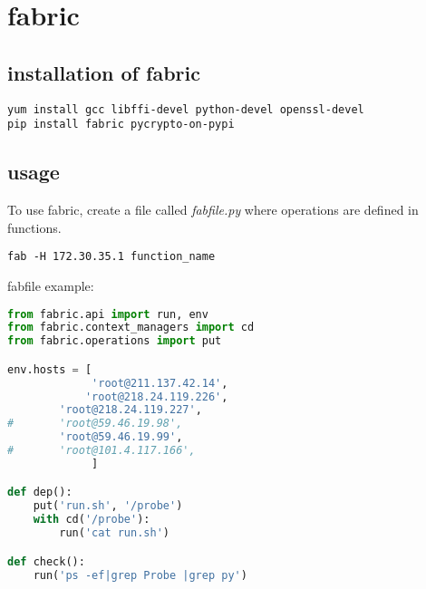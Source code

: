 \section{fabric}

\subsection{installation of fabric}

\begin{verbatim}
yum install gcc libffi-devel python-devel openssl-devel
pip install fabric pycrypto-on-pypi
\end{verbatim}



\subsection{usage}

To use fabric, create a file called \textit{fabfile.py} where operations are
defined in functions.

\begin{verbatim}
fab -H 172.30.35.1 function_name
\end{verbatim}

fabfile example:
\begin{lstlisting}[language=Python]
from fabric.api import run, env
from fabric.context_managers import cd
from fabric.operations import put

env.hosts = [
             'root@211.137.42.14',
            'root@218.24.119.226',
        'root@218.24.119.227',
#       'root@59.46.19.98',
        'root@59.46.19.99',
#       'root@101.4.117.166',
             ]

def dep():
    put('run.sh', '/probe')
    with cd('/probe'):
        run('cat run.sh')

def check():
    run('ps -ef|grep Probe |grep py')

\end{lstlisting}

